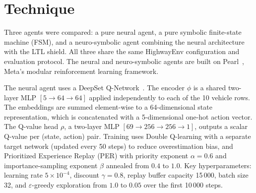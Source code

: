 \documentclass[11pt,a4paper]{article}
\begin{document}
\section{Technique}

Three agents were compared: a pure neural agent, a pure symbolic finite-state machine (FSM), and a neuro-symbolic agent combining the neural architecture with the LTL shield. All three share the same HighwayEnv configuration and evaluation protocol. The neural and neuro-symbolic agents are built on Pearl~\cite{pearl2023}, Meta's modular reinforcement learning framework.

The neural agent uses a DeepSet Q-Network~\cite{zaheer2017}. The encoder \(\phi\) is a shared two-layer MLP \([5 \to 64 \to 64]\) applied independently to each of the 10 vehicle rows. The embeddings are summed element-wise to a 64-dimensional state representation, which is concatenated with a 5-dimensional one-hot action vector. The Q-value head \(\rho\), a two-layer MLP \([69 \to 256 \to 256 \to 1]\), outputs a scalar Q-value per (state, action) pair. Training uses Double Q-learning with a separate target network (updated every 50 steps) to reduce overestimation bias, and Prioritized Experience Replay (PER) with priority exponent \(\alpha = 0.6\) and importance-sampling exponent \(\beta\) annealed from \(0.4\) to \(1.0\). Key hyperparameters: learning rate \(5 \times 10^{-4}\), discount \(\gamma = 0.8\), replay buffer capacity 15\,000, batch size 32, and \(\varepsilon\)-greedy exploration from \(1.0\) to \(0.05\) over the first 10\,000 steps.
\end{document}
